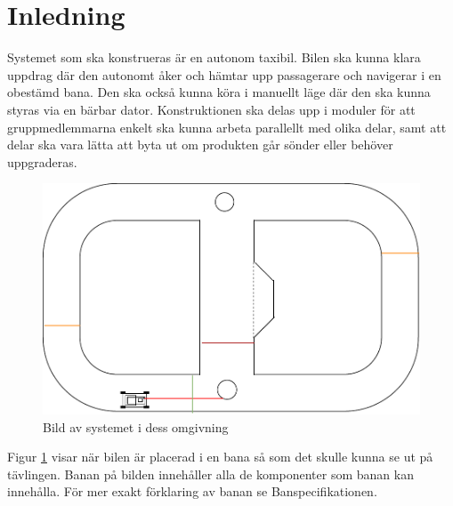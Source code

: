 \documentclass[systemskiss/skiss.tex]{subfiles}
\begin{document}
\section{Inledning}
Systemet som ska konstrueras är en autonom taxibil. Bilen ska kunna klara uppdrag där den autonomt åker och hämtar upp passagerare och navigerar i en obestämd bana. Den ska också kunna köra i manuellt läge där den ska kunna styras via en bärbar dator. Konstruktionen ska delas upp i moduler för att gruppmedlemmarna enkelt ska kunna arbeta parallellt med olika delar, samt att delar ska vara lätta att byta ut om produkten går sönder eller behöver uppgraderas.

\begin{figure}[h]
    \centering
    \includegraphics[width=0.6\linewidth]{systemskiss/figures/systemomgivning.pdf}
    \caption{Bild av systemet i dess omgivning}
    \label{fig:omgivning}
\end{figure}

Figur \ref{fig:omgivning} visar när bilen är placerad i en bana så som det skulle kunna se ut på tävlingen. Banan på bilden innehåller alla de komponenter som banan kan innehålla. För mer exakt förklaring av banan se Banspecifikationen.
\end{document}
